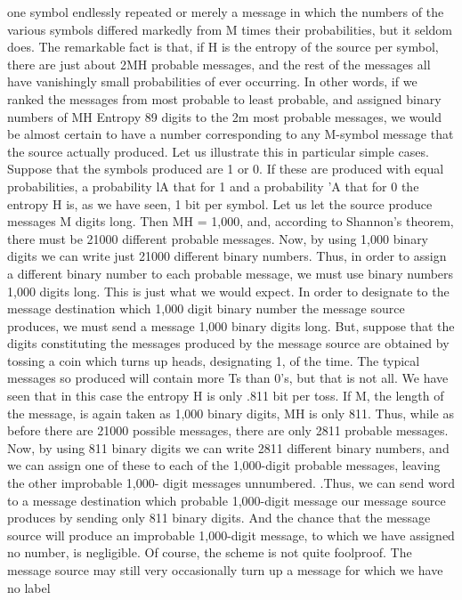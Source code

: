 one symbol endlessly repeated or merely a message in which the
numbers of the various symbols differed markedly from M times
their probabilities, but it seldom does.
The remarkable fact is that, if H is the entropy of the source per
symbol, there are just about 2MH probable messages, and the rest
of the messages all have vanishingly small probabilities of ever
occurring. In other words, if we ranked the messages from most
probable to least probable, and assigned binary numbers of MH
Entropy 89
digits to the 2m most probable messages, we would be almost
certain to have a number corresponding to any M-symbol message
that the source actually produced.
Let us illustrate this in particular simple cases. Suppose that the
symbols produced are 1 or 0. If these are produced with equal
probabilities, a probability lA that for 1 and a probability 'A that
for 0 the entropy H is, as we have seen, 1 bit per symbol. Let us
let the source produce messages M digits long. Then MH = 1,000,
and, according to Shannon’s theorem, there must be 21000 different
probable messages.
Now, by using 1,000 binary digits we can write just 21000 different
binary numbers. Thus, in order to assign a different binary number
to each probable message, we must use binary numbers 1,000
digits long. This is just what we would expect. In order to designate
to the message destination which 1,000 digit binary number
the message source produces, we must send a message 1,000 binary
digits long.
But, suppose that the digits constituting the messages produced
by the message source are obtained by tossing a coin which turns
up heads, designating 1, %
of the time. The typical messages so produced will contain more
Ts than 0’s, but that is not all. We have seen that in this case the
entropy H is only .811 bit per toss. If M, the length of the message,
is again taken as 1,000 binary digits, MH is only 811. Thus, while
as before there are 21000 possible messages, there are only 2811
probable messages.
Now, by using 811 binary digits we can write 2811 different
binary numbers, and we can assign one of these to each of the
1,000-digit probable messages, leaving the other improbable 1,000-
digit messages unnumbered. .Thus, we can send word to a message
destination which probable 1,000-digit message our message source
produces by sending only 811 binary digits. And the chance that
the message source will produce an improbable 1,000-digit message,
to which we have assigned no number, is negligible. Of
course, the scheme is not quite foolproof. The message source may
still very occasionally turn up a message for which we have no label
